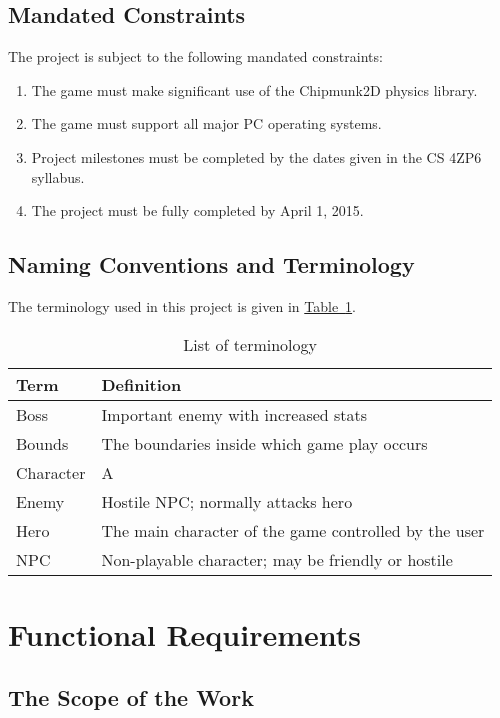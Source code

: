 \documentclass[12pt, titlepage]{article}
\begin{document}
\subsection{Mandated Constraints}

The project is subject to the following mandated constraints:

\begin{enumerate}
  \item The game must make significant use of the Chipmunk2D physics library.
  \item The game must support all major PC operating systems.
  \item Project milestones must be completed by the dates given in the CS 4ZP6 syllabus.
  \item The project must be fully completed by April 1, 2015.
\end{enumerate}

\subsection{Naming Conventions and Terminology}
The terminology used in this project is given in \hyperref[tab:terminology]{Table~\ref*{tab:terminology}}.
\begin{table}
\caption{List of terminology} \label{tab:terminology}
\begin{tabularx}{\textwidth}{p{3cm}X}
\toprule {\bf Term} & {\bf Definition}\\
\midrule
Boss & Important enemy with increased stats\\
Bounds & The boundaries inside which game play occurs\\
Character & A\\
Enemy & Hostile NPC; normally attacks hero\\
Hero & The main character of the game controlled by the user\\
NPC & Non-playable character; may be friendly or hostile\\
\bottomrule
\end{tabularx}
\end{table}

\section{Functional Requirements}
\subsection{The Scope of the Work}
\end{document}

